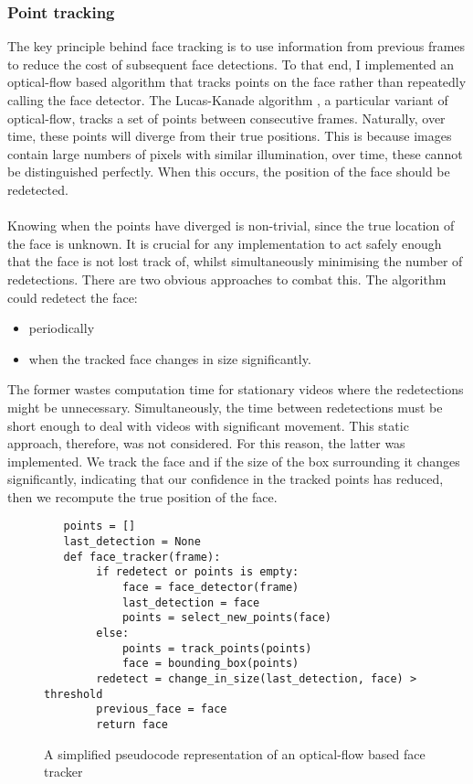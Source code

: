 \subsubsection{Point tracking}
The key principle behind face tracking is to use information from previous frames to reduce the cost of subsequent face detections.
To that end, I implemented an optical-flow based algorithm that tracks points on the face rather than repeatedly calling the face detector. The Lucas-Kanade algorithm \cite{LucasKanade}, a particular variant of optical-flow, tracks a set of points between consecutive frames. Naturally, over time, these points will diverge from their true positions. This is because images contain large numbers of pixels with similar illumination, over time, these cannot be distinguished perfectly. When this occurs, the position of the face should be redetected. 
\\ \\
Knowing when the points have diverged is non-trivial, since the true location of the face is unknown. It is crucial for any implementation to act safely enough that the face is not lost track of, whilst simultaneously minimising the number of redetections.
There are two obvious approaches to combat this. The algorithm could redetect the face: 
\begin{itemize}
    \item periodically 
    \item when the tracked face changes in size significantly. 
\end{itemize}
The former wastes computation time for stationary videos where the redetections might be unnecessary. Simultaneously, the time between redetections must be short enough to deal with videos with significant movement. This static approach, therefore, was not considered. For this reason, the latter was implemented. We track the face and if the size of the box surrounding it changes significantly, indicating that our confidence in the tracked points has reduced, then we recompute the true position of the face.
\begin{figure}[H]
\begin{verbatim}
   points = []
   last_detection = None
   def face_tracker(frame):
        if redetect or points is empty:
            face = face_detector(frame) 
            last_detection = face
            points = select_new_points(face)
        else:
            points = track_points(points)
            face = bounding_box(points)
        redetect = change_in_size(last_detection, face) > threshold
        previous_face = face
        return face
\end{verbatim}
\caption{A simplified pseudocode representation of an optical-flow based face tracker}
\end{figure} 
